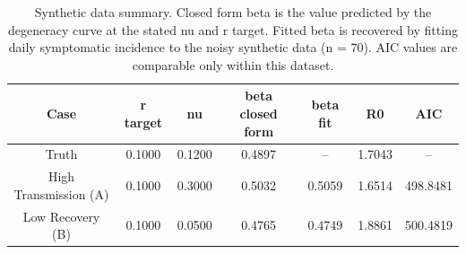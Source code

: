 \begin{table}[!ht]
\centering
\begin{tabular}{ccccccc}
\toprule
Case & r target & nu & beta closed form & beta fit & R0 & AIC \\
\midrule
Truth & 0.1000 & 0.1200 & 0.4897 & -- & 1.7043 & -- \\
High Transmission (A) & 0.1000 & 0.3000 & 0.5032 & 0.5059 & 1.6514 & 498.8481 \\
Low Recovery (B) & 0.1000 & 0.0500 & 0.4765 & 0.4749 & 1.8861 & 500.4819 \\
\bottomrule
\end{tabular}
\caption{Synthetic data summary. Closed form beta is the value predicted by the degeneracy curve at the stated nu and r target. Fitted beta is recovered by fitting daily symptomatic incidence to the noisy synthetic data (n = 70). AIC values are comparable only within this dataset.}
\label{tab:synthetic_summary}
\end{table}

